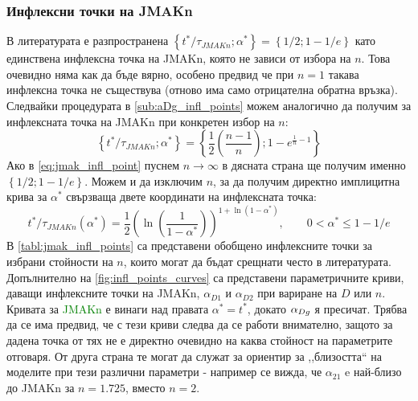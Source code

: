 \subsubsection{Инфлексни точки на JMAKn}
В литературата е разпространена $\left\{t^*/\tau_{JMAKn};\alpha^* \right\} = \left\{1/2; 1 - 1/e \right\}$ \cite{Avramov2005} като единствена инфлексна точка на JMAKn, която не зависи от избора на $n$. Това очевидно няма как да бъде вярно, особено предвид че при $n = 1$ такава инфлексна точка не съществува (отново има само отрицателна обратна връзка).
Следвайки процедурата в \autoref{sub:aDg_infl_points} можем аналогично да получим за инфлексната точка на JMAKn при конкретен избор на $n$:
\begin{equation}
    \label{eq:jmak_infl_point}
     \left\{ t^* / \tau_{JMAKn}; \alpha^* \right\}  = \left\{\frac{1}{2} \left( \frac{n-1}{n} \right); 1-e^{\frac{1}{n} - 1}\right\}
\end{equation}
Ако в \autoref{eq:jmak_infl_point} пуснем $n \rightarrow \infty$ в дясната страна ще получим именно $\left\{1/2; 1 - 1/e \right\}$.
Можем и да изключим $n$, за да получим директно имплицитна крива за $\alpha^*$ свързваща двете координати на инфлексната точка:
\begin{equation*}
    t^*/\tau_{JMAKn} (\alpha ^ *) = \frac{1}{2}\left( \ln{\left( \frac{1}{1-\alpha^*} \right)} \right)^{1+\ln{(1-\alpha^*)}}, \qquad 0 < \alpha^* \le  1 - 1/e 
\end{equation*}
В \autoref{tabl:jmak_infl_points} са представени обобщено инфлексните точки за избрани стойности на $n$, които могат да бъдат срещнати често в литературата. Допълнително на \autoref{fig:infl_points_curves} са представени параметричните криви, даващи инфлексните точки на JMAKn, $\alpha_{D1}$  и $\alpha_{D2}$ при вариране на $D$ или $n$. Кривата за \textcolor{green}{JMAKn} е винаги над правата $\alpha^* = t^*$, докато $\alpha_{Dg}$ я пресичат. Трябва да се има предвид, че с тези криви следва да се работи внимателно, защото за дадена точка от тях не е директно очевидно на каква стойност на параметрите отговаря. От друга страна те могат да служат за ориентир за ,,близостта`` на моделите при тези различни параметри - например се вижда, че $\alpha_{21}$ e най-близо до JMAKn за $n = 1.725$, вместо $n = 2$.

